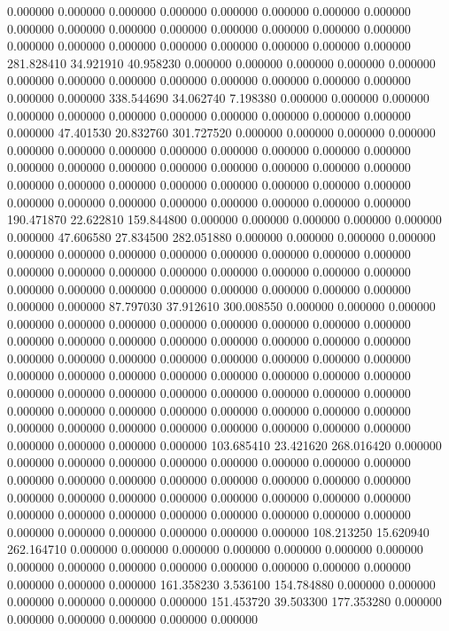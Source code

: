 0.000000 0.000000 0.000000
0.000000 0.000000 0.000000
0.000000 0.000000 0.000000
0.000000 0.000000 0.000000
0.000000 0.000000 0.000000
0.000000 0.000000 0.000000
0.000000 0.000000 0.000000
0.000000 0.000000 0.000000
281.828410 34.921910 40.958230
0.000000 0.000000 0.000000
0.000000 0.000000 0.000000
0.000000 0.000000 0.000000
0.000000 0.000000 0.000000
0.000000 0.000000 0.000000
338.544690 34.062740 7.198380
0.000000 0.000000 0.000000
0.000000 0.000000 0.000000
0.000000 0.000000 0.000000
0.000000 0.000000 0.000000
47.401530 20.832760 301.727520
0.000000 0.000000 0.000000
0.000000 0.000000 0.000000
0.000000 0.000000 0.000000
0.000000 0.000000 0.000000
0.000000 0.000000 0.000000
0.000000 0.000000 0.000000
0.000000 0.000000 0.000000
0.000000 0.000000 0.000000
0.000000 0.000000 0.000000
0.000000 0.000000 0.000000
0.000000 0.000000 0.000000
0.000000 0.000000 0.000000
190.471870 22.622810 159.844800
0.000000 0.000000 0.000000
0.000000 0.000000 0.000000
47.606580 27.834500 282.051880
0.000000 0.000000 0.000000
0.000000 0.000000 0.000000
0.000000 0.000000 0.000000
0.000000 0.000000 0.000000
0.000000 0.000000 0.000000
0.000000 0.000000 0.000000
0.000000 0.000000 0.000000
0.000000 0.000000 0.000000
0.000000 0.000000 0.000000
0.000000 0.000000 0.000000
87.797030 37.912610 300.008550
0.000000 0.000000 0.000000
0.000000 0.000000 0.000000
0.000000 0.000000 0.000000
0.000000 0.000000 0.000000
0.000000 0.000000 0.000000
0.000000 0.000000 0.000000
0.000000 0.000000 0.000000
0.000000 0.000000 0.000000
0.000000 0.000000 0.000000
0.000000 0.000000 0.000000
0.000000 0.000000 0.000000
0.000000 0.000000 0.000000
0.000000 0.000000 0.000000
0.000000 0.000000 0.000000
0.000000 0.000000 0.000000
0.000000 0.000000 0.000000
0.000000 0.000000 0.000000
0.000000 0.000000 0.000000
0.000000 0.000000 0.000000
0.000000 0.000000 0.000000
0.000000 0.000000 0.000000
103.685410 23.421620 268.016420
0.000000 0.000000 0.000000
0.000000 0.000000 0.000000
0.000000 0.000000 0.000000
0.000000 0.000000 0.000000
0.000000 0.000000 0.000000
0.000000 0.000000 0.000000
0.000000 0.000000 0.000000
0.000000 0.000000 0.000000
0.000000 0.000000 0.000000
0.000000 0.000000 0.000000
0.000000 0.000000 0.000000
0.000000 0.000000 0.000000
0.000000 0.000000 0.000000
108.213250 15.620940 262.164710
0.000000 0.000000 0.000000
0.000000 0.000000 0.000000
0.000000 0.000000 0.000000
0.000000 0.000000 0.000000
0.000000 0.000000 0.000000
0.000000 0.000000 0.000000
161.358230 3.536100 154.784880
0.000000 0.000000 0.000000
0.000000 0.000000 0.000000
151.453720 39.503300 177.353280
0.000000 0.000000 0.000000
0.000000 0.000000 0.000000
